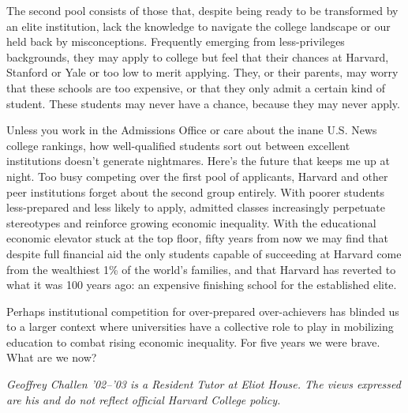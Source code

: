 The second pool consists of those that, despite being ready to be transformed
by an elite institution, lack the knowledge to navigate the college landscape
or our held back by misconceptions. Frequently emerging from less-privileges
backgrounds, they may apply to college but feel that their chances at
Harvard, Stanford or Yale or too low to merit applying. They, or their
parents, may worry that these schools are too expensive, or that they only
admit a certain kind of student. These students may never have a chance,
because they may never apply.

Unless you work in the Admissions Office or care about the inane U.S. News
college rankings, how well-qualified students sort out between excellent
institutions doesn't generate nightmares. Here's the future that keeps me up
at night. Too busy competing over the first pool of applicants, Harvard and
other peer institutions forget about the second group entirely. With poorer
students less-prepared and less likely to apply, admitted classes
increasingly perpetuate stereotypes and reinforce growing economic
inequality. With the educational economic elevator stuck at the top floor,
fifty years from now we may find that despite full financial aid the only
students capable of succeeding at Harvard come from the wealthiest 1\% of the
world's families, and that Harvard has reverted to what it was 100 years ago:
an expensive finishing school for the established elite.

Perhaps institutional competition for over-prepared over-achievers has
blinded us to a larger context where universities have a collective role to
play in mobilizing education to combat rising economic inequality. For five
years we were brave. What are we now?


\textit{Geoffrey Challen '02--'03 is a Resident Tutor at Eliot House. The
views expressed are his and do not reflect official Harvard College policy.}

